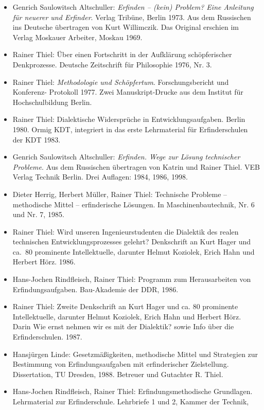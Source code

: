 \documentclass[12pt,a4paper]{article}
\begin{document}
\begin{itemize}
\item Genrich Saulowitsch Altschuller: \emph{Erfinden – (kein) Problem? Eine
  Anleitung für neuerer und Erfinder}. Verlag Tribüne, Berlin 1973. Aus dem
  Russischen ins Deutsche übertragen von Kurt Willimczik. Das Original erschien
  im Verlag Moskauer Arbeiter, Moskau 1969.
\item Rainer Thiel: Über einen Fortschritt in der Aufklärung schöpferischer
  Denkprozesse. Deutsche Zeitschrift für Philosophie 1976, Nr. 3.
\item Rainer Thiel: \emph{Methodologie und Schöpfertum}. Forschungsbericht und
  Konferenz- Protokoll 1977. Zwei Manuskript-Drucke aus dem Institut für
  Hochschulbildung Berlin.
\item Rainer Thiel: Dialektische Widersprüche in Entwicklungsaufgaben. Berlin
  1980.  Ormig KDT, integriert in das erste Lehrmaterial für Erfinderschulen
  der KDT 1983.
\item Genrich Saulowitsch Altschuller: \emph{Erfinden. Wege zur Lösung
  technischer Probleme}. Aus dem Russischen übertragen von Katrin und Rainer
  Thiel. VEB Verlag Technik Berlin. Drei Auflagen: 1984, 1986, 1998.
\item Dieter Herrig, Herbert Müller, Rainer Thiel: Technische Probleme –
  methodische Mittel – erfinderische Lösungen. In Maschinenbautechnik, Nr. 6
  und Nr. 7, 1985.
\item Rainer Thiel: Wird unseren Ingenieurstudenten die Dialektik des realen
  technischen Entwicklungsprozesses gelehrt? Denkschrift an Kurt Hager und
  ca.\ 80 prominente Intellektuelle, darunter Helmut Koziolek, Erich Hahn und
  Herbert Hörz. 1986.
\item Hans-Jochen Rindfleisch, Rainer Thiel: Programm zum Herausarbeiten von
  Erfindungsaufgaben. Bau-Akademie der DDR, 1986.
\item Rainer Thiel: Zweite Denkschrift an Kurt Hager und ca. 80 prominente
  Intellektuelle, darunter Helmut Koziolek, Erich Hahn und Herbert Hörz. Darin
  {\glqq}Wie ernst nehmen wir es mit der Dialektik?{\grqq} sowie Info über die
  Erfinderschulen. 1987.
\item Hansjürgen Linde: Gesetzmäßigkeiten, methodische Mittel und Strategien
  zur Bestimmung von Erfindungsaufgaben mit erfinderischer Zielstellung.
  Dissertation, TU Dresden, 1988. Betreuer und Gutachter R. Thiel.
\item Hans-Jochen Rindfleisch, Rainer Thiel: Erfindungsmethodische Grundlagen.
  Lehrmaterial zur Erfinderschule. Lehrbriefe 1 und 2, Kammer der Technik,

\end{itemize}
\end{document}
